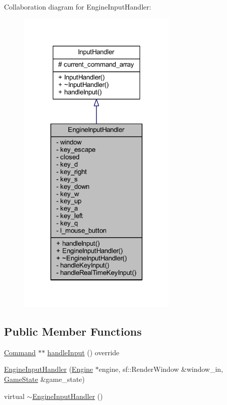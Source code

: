 Collaboration diagram for Engine\+Input\+Handler\+:
\nopagebreak
\begin{figure}[H]
\begin{center}
\leavevmode
\includegraphics[width=216pt]{class_engine_input_handler__coll__graph}
\end{center}
\end{figure}
\subsection*{Public Member Functions}
\begin{DoxyCompactItemize}
\item 
\hyperlink{class_command}{Command} $\ast$$\ast$ \hyperlink{class_engine_input_handler_ade92afaf7657007c2be3b5bd745c96e3}{handle\+Input} () override
\item 
\hyperlink{class_engine_input_handler_a0fb16f260399a8f4384001b9ffa352de}{Engine\+Input\+Handler} (\hyperlink{class_engine}{Engine} $\ast$engine, sf\+::\+Render\+Window \&window\+\_\+in, \hyperlink{class_game_state}{Game\+State} \&game\+\_\+state)
\item 
virtual \hyperlink{class_engine_input_handler_a92a875197705110bd6b2debfe7dbee6a}{$\sim$\+Engine\+Input\+Handler} ()
\end{DoxyCompactItemize}
